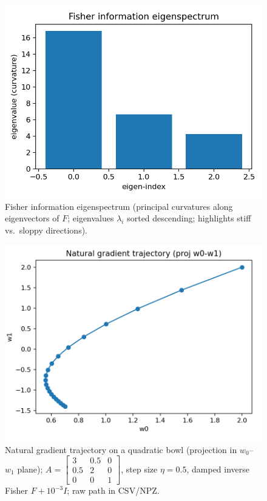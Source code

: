\documentclass[
]{article}
\begin{document}
\begin{figure}
\hypertarget{fig:fim_eigenspectrum}{%
\centering
\includegraphics{../output/fisher_information_eigenspectrum.png}
\caption{Fisher information eigenspectrum (principal curvatures along
eigenvectors of \(F\); eigenvalues \(\lambda_i\) sorted descending;
highlights stiff vs.~sloppy directions).}\label{fig:fim_eigenspectrum}
}
\end{figure}

\begin{figure}
\hypertarget{fig:natural_gradient_path}{%
\centering
\includegraphics{../output/natural_gradient_path.png}
\caption{Natural gradient trajectory on a quadratic bowl (projection in
\(w_0\)--\(w_1\) plane);
\(A=\begin{bmatrix}3 & 0.5 & 0\\ 0.5 & 2 & 0\\ 0 & 0 & 1\end{bmatrix}\),
step size \(\eta=0.5\), damped inverse Fisher \(F + 10^{-3} I\); raw
path in CSV/NPZ.}\label{fig:natural_gradient_path}
}
\end{figure}
\end{document}
